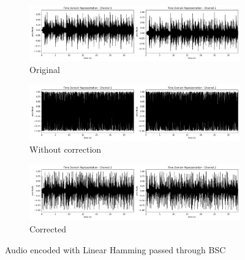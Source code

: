 \documentclass{article}
\begin{document}
\begin{figure}
    \centering
    \begin{subfigure}[b]{\textwidth}
        \centering
        \includegraphics[width=\textwidth]{../Result/wav-time-domain-TX.png}
        \caption{Original}
        \label{fig:t-audio-linear-bsc-original}
    \end{subfigure}
    \begin{subfigure}[b]{\textwidth}
        \centering
        \includegraphics[width=\textwidth]{../Result/linear-bsc-wav-time-domain-RX.png}
        \caption{Without correction}
        \label{fig:t-audio-linear-bsc-no-correction}
    \end{subfigure}
    \begin{subfigure}[b]{\textwidth}
        \centering
        \includegraphics[width=\textwidth]{../Result/linear-bsc-wav-time-domain-RX-syndrome-corrected.png}
        \caption{Corrected}
        \label{fig:t-audio-linear-bsc-syndrome-syndrome-corrected}
    \end{subfigure}
       \caption{Audio encoded with Linear Hamming passed through BSC}
       \label{fig:t-audio-linear-bsc}
\end{figure}
\end{document}
